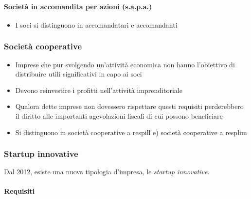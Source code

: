 \paragraph{Società in accomandita per azioni (s.a.p.a.)}
\begin{itemize}
    \item I soci si distinguono in accomandatari e accomandanti
\end{itemize}


\subsubsection{Società cooperative}

\begin{itemize}
    \item Imprese che pur svolgendo un’attività economica non hanno l’obiettivo di
    distribuire utili significativi in capo ai soci
    \item Devono reinvestire i profitti nell’attività imprenditoriale
    \item Qualora dette imprese non dovessero rispettare questi requisiti perderebbero
    il diritto alle importanti agevolazioni fiscali di cui possono beneficiare
    \item Si distinguono in società cooperative a \gls{respill} e) società
    cooperative a \gls{resplim}
\end{itemize}

\subsubsection{Startup innovative}
Dal 2012, esiste una nuova tipologia d'impresa, le \emph{startup innovative}.

\paragraph{Requisiti}

